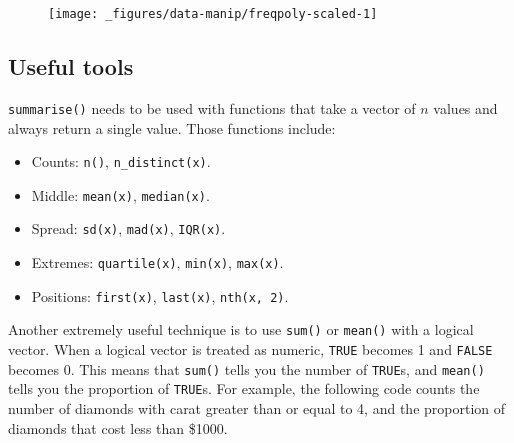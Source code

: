 \begin{figure}[H]
  \centering
  \texttt{[image: \_figures/data-manip/freqpoly-scaled-1]}
\end{figure}

\subsection{Useful tools}\label{useful-tools-2}

\texttt{summarise()} needs to be used with functions that take a vector
of \(n\) values and always return a single value. Those functions
include:

\begin{itemize}
\tightlist
\item
  Counts: \texttt{n()}, \texttt{n\_distinct(x)}.
\item
  Middle: \texttt{mean(x)}, \texttt{median(x)}.
\item
  Spread: \texttt{sd(x)}, \texttt{mad(x)}, \texttt{IQR(x)}.
\item
  Extremes: \texttt{quartile(x)}, \texttt{min(x)}, \texttt{max(x)}.
\item
  Positions: \texttt{first(x)}, \texttt{last(x)}, \texttt{nth(x,\ 2)}.
\end{itemize}

Another extremely useful technique is to use \texttt{sum()} or
\texttt{mean()} with a logical vector. When a logical vector is treated
as numeric, \texttt{TRUE} becomes 1 and \texttt{FALSE} becomes 0. This
means that \texttt{sum()} tells you the number of \texttt{TRUE}s, and
\texttt{mean()} tells you the proportion of \texttt{TRUE}s. For example,
the following code counts the number of diamonds with carat greater than
or equal to 4, and the proportion of diamonds that cost less than
\$1000.

\begin{Shaded}
\begin{Highlighting}[]
   \StringTok{ }\NormalTok{), }
   \StringTok{ }\NormalTok{)}
\NormalTok{)}
\CommentTok{#> }
\end{Highlighting}
\end{Shaded}

